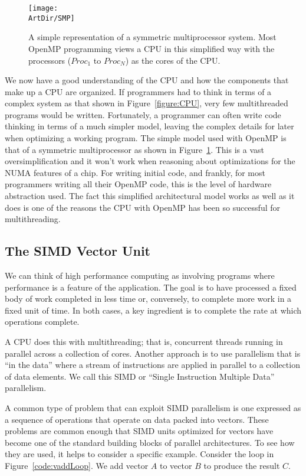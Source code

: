 \begin{figure}[t]
\centerline{\texttt{[image: \\ArtDir/SMP]}}
\caption{A simple representation of a symmetric multiprocessor system.  Most OpenMP programming views a CPU
in this simplified way with the processors ($Proc_1$ to $Proc_N$) as the cores of the CPU.}
\label{figure:SMP}
\end{figure}

We now have a good understanding of the CPU and how the components that make up a CPU are organized.  If programmers had
to think in terms of a complex system as that shown in Figure~\ref{figure:CPU}, very few multithreaded programs would be written.
Fortunately, a programmer can often write code thinking in terms of a much simpler model, leaving the complex details for later when
optimizing a working program. The simple model used with OpenMP is that of a symmetric multiprocessor as shown in Figure~\ref{figure:SMP}.
This is a vast oversimplification and it won't work when reasoning about optimizations for the NUMA features of a chip.  For writing initial code, and 
frankly, for most programmers writing all their OpenMP code, this is the level of hardware abstraction used.  The fact this simplified architectural 
model works as well as it does is one of the reasons the CPU with OpenMP has been so successful for multithreading. 


\subsection{The SIMD Vector Unit}

We can think of high performance computing as involving programs where performance is a feature of the application.
The goal is to have processed a fixed body of work completed in less time or, conversely, to complete more work in a fixed unit of time.
In both cases, a key ingredient is to complete the rate at which operations complete.   

A CPU does this with multithreading; that is, concurrent threads running in parallel across a collection of cores. 
Another approach is to use parallelism that is ``in the data'' where a stream of instructions are applied in
parallel to a collection of data elements.  We call this 
SIMD or ``Single Instruction Multiple Data'' parallelism.

A common type of problem that can exploit SIMD parallelism is one expressed as a sequence of
operations that operate on data packed into vectors.   These problems are common enough that SIMD units optimized
for vectors have become one of the standard building blocks of parallel architectures.  To see
how they are used, it helps to consider a specific example.  Consider the loop in Figure~\ref{code:vaddLoop}.  
We add vector $A$ to vector $B$ to produce the result $C$.   


